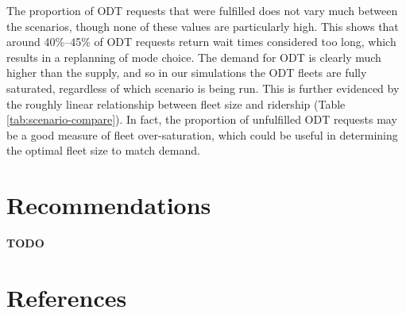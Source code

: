 \documentclass[
]{report}
\begin{document}
The proportion of ODT requests that were fulfilled does not vary much between the scenarios, though none of these values are particularly high. This shows that around 40\%--45\% of ODT requests return wait times considered too long, which results in a replanning of mode choice. The demand for ODT is clearly much higher than the supply, and so in our simulations the ODT fleets are fully saturated, regardless of which scenario is being run. This is further evidenced by the roughly linear relationship between fleet size and ridership (Table \ref{tab:scenario-compare}). In fact, the proportion of unfulfilled ODT requests may be a good measure of fleet over-saturation, which could be useful in determining the optimal fleet size to match demand.

\hypertarget{recommendations}{%
\chapter{Recommendations}\label{recommendations}}

\textbf{TODO}

\hypertarget{references}{%
\chapter*{References}\label{references}}
\end{document}
